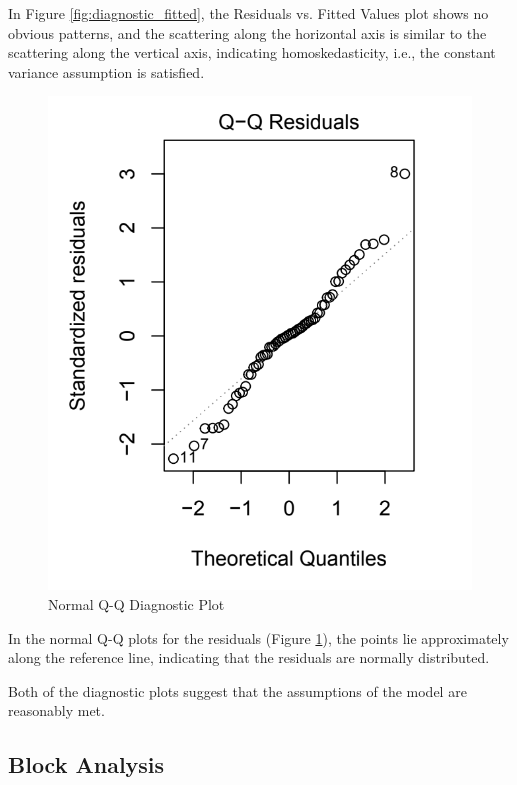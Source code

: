 \documentclass[11pt,a4paper,twoside]{tau-book}
\begin{document}
In Figure \ref{fig:diagnostic_fitted}, the Residuals vs. Fitted Values plot shows no obvious patterns, and the scattering along the horizontal axis is similar to the scattering along the vertical axis, indicating homoskedasticity, i.e., the constant variance assumption is satisfied.

\begin{figure}[H]
        \centering
        \includegraphics[width=0.8\columnwidth]{Figures/diagnostic_qq.png}
        \caption{Normal Q-Q Diagnostic Plot}
        \label{fig:diagnostic_qq}
\end{figure}

In the normal Q-Q plots for the residuals (Figure \ref{fig:diagnostic_qq}), the points lie approximately along the reference line, indicating that the residuals are normally distributed. 

Both of the diagnostic plots suggest that the assumptions of the model are reasonably met.

\subsection{Block Analysis}
\end{document}

